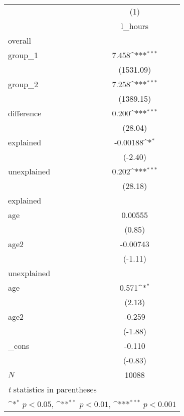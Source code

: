 \begin{table}
    \begin{center}
\def\sym#1{\ifmmode^{#1}\else\(^{#1}\)\fi}
\begin{tabular}{l*{1}{c}}
\hline\hline
            &\multicolumn{1}{c}{(1)}\\
            &\multicolumn{1}{c}{l\_hours}\\
\hline
overall     &                     \\
group\_1     &       7.458\sym{***}\\
            &   (1531.09)         \\
[1em]
group\_2     &       7.258\sym{***}\\
            &   (1389.15)         \\
[1em]
difference  &       0.200\sym{***}\\
            &     (28.04)         \\
[1em]
explained   &    -0.00188\sym{*}  \\
            &     (-2.40)         \\
[1em]
unexplained &       0.202\sym{***}\\
            &     (28.18)         \\
\hline
explained   &                     \\
age         &     0.00555         \\
            &      (0.85)         \\
[1em]
age2        &    -0.00743         \\
            &     (-1.11)         \\
\hline
unexplained &                     \\
age         &       0.571\sym{*}  \\
            &      (2.13)         \\
[1em]
age2        &      -0.259         \\
            &     (-1.88)         \\
[1em]
\_cons      &      -0.110         \\
            &     (-0.83)         \\
\hline
\(N\)       &       10088         \\
\hline\hline
\multicolumn{2}{l}{\footnotesize \textit{t} statistics in parentheses}\\
\multicolumn{2}{l}{\footnotesize \sym{*} \(p<0.05\), \sym{**} \(p<0.01\), \sym{***} \(p<0.001\)}\\
\end{tabular}
\end{center}
\end{table}
